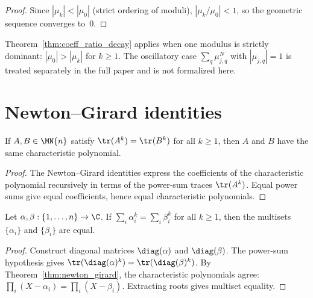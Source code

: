 \begin{proof}\leanok
	Since $|\mu_k| < |\mu_0|$ (strict ordering of moduli),
	$|\mu_k / \mu_0| < 1$, so the geometric sequence
	converges to~$0$.
\end{proof}

\begin{remark}\notready
	Theorem~\ref{thm:coeff_ratio_decay} applies when one
	modulus is strictly dominant:
	$|\mu_0| > |\mu_k|$ for $k \ge 1$.
	The oscillatory case
	$\sum_q \mu_{j,q}^N$ with $|\mu_{j,q}| = 1$
	is treated separately in the full paper and is not formalized here.
\end{remark}

\section{Newton--Girard identities}

\begin{theorem}\label{thm:newton_girard}
	\leanok
	If $A, B \in \MN{n}$ satisfy
	$\tr(A^k) = \tr(B^k)$ for all $k \ge 1$,
	then $A$ and $B$ have the same characteristic polynomial.
\end{theorem}

\begin{proof}
	\leanok
	The Newton--Girard identities express the coefficients
	of the characteristic polynomial recursively in terms
	of the power-sum traces $\tr(A^k)$.
	Equal power sums give equal coefficients, hence equal
	characteristic polynomials.
\end{proof}

\begin{theorem}\label{thm:power_sum_multiset}
	\leanok
	Let $\alpha, \beta : \{1, \ldots, n\} \to \C$.
	If $\sum_i \alpha_i^k = \sum_i \beta_i^k$ for all $k \ge 1$,
	then the multisets $\{\alpha_i\}$ and $\{\beta_i\}$ are equal.
\end{theorem}

\begin{proof}
	\leanok
	Construct diagonal matrices $\diag(\alpha)$ and
	$\diag(\beta)$.
	The power-sum hypothesis gives
	$\tr(\diag(\alpha)^k) = \tr(\diag(\beta)^k)$.
	By Theorem~\ref{thm:newton_girard}, the characteristic
	polynomials agree: $\prod_i (X - \alpha_i) = \prod_i (X - \beta_i)$.
	Extracting roots gives multiset equality.
\end{proof}

